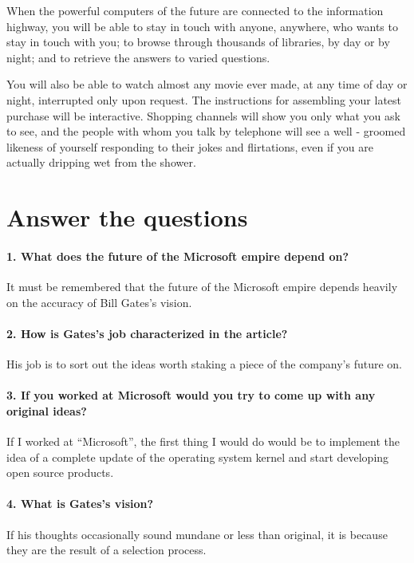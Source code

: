 \documentclass[a5paper, 12pt, twoside]{extreport}
\begin{document}
When the powerful computers of the future are connected to the information highway, you will be able to stay in touch with anyone, anywhere, who wants to stay in touch with you; to browse through thousands of libraries, by day or by night; and to retrieve the answers to varied questions.


You will also be able to watch almost any movie ever made, at any time of day or night, interrupted only upon request. The instructions for assembling your latest purchase will be interactive. Shopping channels will show you only what you ask to see, and the people with whom you talk by telephone will see a well - groomed likeness of yourself responding to their jokes and flirtations, even if you are actually dripping wet from the shower.

\section*{Answer the questions}
    \paragraph{1. What does the future of the Microsoft empire depend on?}
    It must be remembered that the future of the Microsoft empire depends heavily on the accuracy of Bill Gates's vision.
    
    \paragraph{2. How is Gates's job characterized in the article?}
    His job is to sort out the ideas worth staking a piece of the company's future on.
    
    \paragraph{3. If you worked at Microsoft would you try to come up with any original ideas?}
    If I worked at ``Microsoft'', the first thing I would do would be to implement the idea of a complete update of the operating system kernel and start developing open source products.
    
    \paragraph{4. What is Gates's vision?}
    If his thoughts occasionally sound mundane or less than original, it is because they are the result of a selection process.
    
\end{document}
